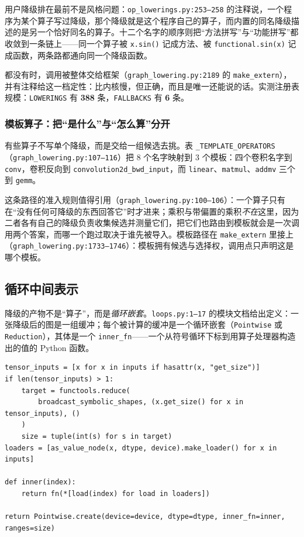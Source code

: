 用户降级排在最前不是风格问题：\texttt{op\_lowerings.py:253--258} 的注释说，一个程序为某个算子写过降级，那个降级就是这个程序自己的算子，而内置的同名降级描述的是另一个恰好同名的算子。十二个名字的顺序则把“方法拼写”与“功能拼写”都收敛到一条链上——同一个算子被 \texttt{x.sin()} 记成方法、被 \texttt{functional.sin(x)} 记成函数，两条路都通向同一个降级函数。

都没有时，调用被整体交给框架（\texttt{graph\_lowering.py:2189} 的 \texttt{make\_extern}），并有注释给这一档定性：比内核慢，但正确，而且是唯一还能说的话。实测注册表规模：\texttt{LOWERINGS} 有 \textbf{388} 条，\texttt{FALLBACKS} 有 \textbf{6} 条。

\subsubsection{模板算子：把“是什么”与“怎么算”分开}

有些算子不写单个降级，而是交给一组候选去挑。表 \texttt{\_TEMPLATE\_OPERATORS}（\texttt{graph\_lowering.py:107--116}）把 8 个名字映射到 3 个模板：四个卷积名字到 \texttt{conv}，卷积反向到 \texttt{convolution2d\_bwd\_input}，而 \texttt{linear}、\texttt{matmul}、\texttt{addmv} 三个到 \texttt{gemm}。

这条路径的准入规则值得引用（\texttt{graph\_lowering.py:100--106}）：一个算子只有在“没有任何可降级的东西回答它”时才进来；乘积与带偏置的乘积\emph{不在}这里，因为二者各有自己的降级负责收集候选并测量它们，把它们也路由到模板就会是一次调用两个答案，而哪一个跑过取决于谁先被导入。模板路径在 \texttt{make\_extern} 里接上（\texttt{graph\_lowering.py:1733--1746}）：模板拥有候选与选择权，调用点只声明这是哪个模板。

\subsection{循环中间表示}

降级的产物不是“算子”，而是\emph{循环嵌套}。\texttt{loops.py:1--17} 的模块文档给出定义：一张降级后的图是一组缓冲；每个被计算的缓冲是一个循环嵌套（\texttt{Pointwise} 或 \texttt{Reduction}），其体是一个 \texttt{inner\_fn}——一个从符号循环下标到用算子处理器构造出的值的 Python 函数。

\begin{lstlisting}[caption={一个逐元素降级如何变成循环嵌套（\texttt{op\_lowerings.py:1145--1178}，节选）。}, label=lst:be:pointwise, style=pystyle]
tensor_inputs = [x for x in inputs if hasattr(x, "get_size")]
if len(tensor_inputs) > 1:
    target = functools.reduce(
        broadcast_symbolic_shapes, (x.get_size() for x in tensor_inputs), ()
    )
    size = tuple(int(s) for s in target)
loaders = [as_value_node(x, dtype, device).make_loader() for x in inputs]

def inner(index):
    return fn(*[load(index) for load in loaders])

return Pointwise.create(device=device, dtype=dtype, inner_fn=inner, ranges=size)
\end{lstlisting}

